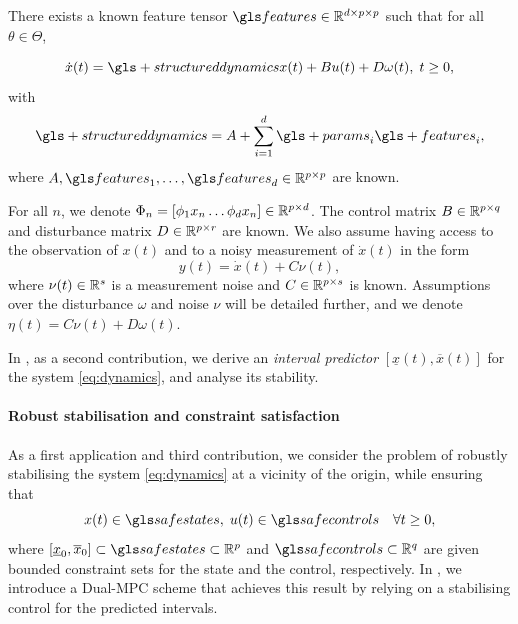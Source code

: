 \begin{assumption}
	\label{assumpt:structure}
	\begin{leftbar}[assumptionbar]
		There exists a known feature tensor $\features\in \Real^{d \times p \times p}$ such that for all $\theta\in\Theta$,
		
		\begin{equation}
		\label{eq:dynamics}
		\dot{x}(t)=\gls+{structureddynamics} x(t) + B u(t) + D \omega(t),\;t\geq0,
		\end{equation}
		with
		\begin{equation}
		\gls+{structureddynamics} = A + \sum_{i=1}^d \gls+{params}_i\gls+{features}_i,
		\end{equation}
		where $A,\features_1,\dots,\features_d\in\Real^{p\times p}$ are known. 
	\end{leftbar}
\end{assumption}
For all $n$, we denote $\Phi_n = [\phi_1 x_n \dots \phi_d x_n]\in\mathbb{R}^{p\times d}$.
The control matrix $B\in\mathbb{R}^{p\times q}$ and disturbance matrix $D\in\mathbb{R}^{p\times r}$ are known. We also assume having access to the observation of $x(t)$ and to a noisy measurement of $\dot{x}(t)$ in the form 
\begin{equation}
\label{eq:outputs}
y(t)=\dot{x}(t) + C\nu(t),
\end{equation}
where $\nu(t)\in\mathbb{R}^s$ is a measurement noise and $C\in\mathbb{R}^{p\times s}$ is known. Assumptions over the disturbance $\omega$ and noise $\nu$ will be detailed further, and we denote $\eta(t) = C\nu(t) + D\omega(t)$. 

In \textbf{}, as a second contribution, we derive an \emph{interval predictor} $[\underline{x}(t),\overline{x}(t)]$ for the system \eqref{eq:dynamics}, and analyse its stability.

\paragraph{Robust stabilisation and constraint satisfaction}

As a first application and third contribution, we consider the problem of robustly stabilising the system \eqref{eq:dynamics} at a vicinity of the origin, while ensuring that
\begin{equation}
x(t)\in\safestates,\;u(t)\in\safecontrols\quad\forall t\geq0, \label{eq:constraints}
\end{equation}
where $[\underline{x}_{0},\overline{x}_{0}]\subset\safestates\subset\Real^{p}$ and $\safecontrols\subset\Real^{q}$ are given bounded constraint sets for the state and the control, respectively.
In \textbf{}, we introduce a Dual-\gls{MPC} scheme that achieves this result by relying on a stabilising control for the predicted intervals.

